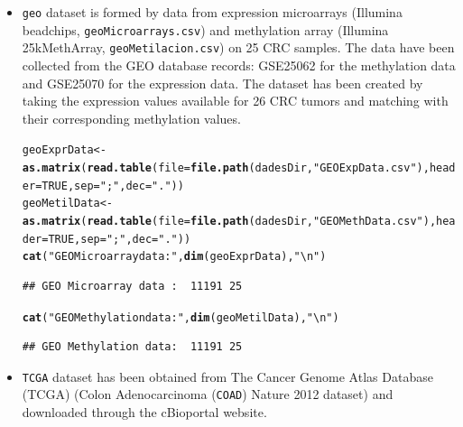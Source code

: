 \documentclass[a4paper,10pt]{article}\usepackage[]{graphicx}\usepackage[]{color}
\makeatletter
\newcommand{\hlnum}[1]{\textcolor[rgb]{0.686,0.059,0.569}{#1}}%
\newcommand{\hlstr}[1]{\textcolor[rgb]{0.192,0.494,0.8}{#1}}%
\newcommand{\hlstd}[1]{\textcolor[rgb]{0.345,0.345,0.345}{#1}}%
\newcommand{\hlkwb}[1]{\textcolor[rgb]{0.69,0.353,0.396}{#1}}%
\newcommand{\hlkwc}[1]{\textcolor[rgb]{0.333,0.667,0.333}{#1}}%
\newcommand{\hlkwd}[1]{\textcolor[rgb]{0.737,0.353,0.396}{\textbf{#1}}}%
\newenvironment{kframe}{%
 \def\at@end@of@kframe{}%
 \ifinner\ifhmode%
  \def\at@end@of@kframe{\end{minipage}}%
  \begin{minipage}{\columnwidth}%
 \fi\fi%
 \def\FrameCommand##1{\hskip\@totalleftmargin \hskip-\fboxsep
 \colorbox{shadecolor}{##1}\hskip-\fboxsep
     \hskip-\linewidth \hskip-\@totalleftmargin \hskip\columnwidth}%
 \MakeFramed {\advance\hsize-\width
   \@totalleftmargin\z@ \linewidth\hsize
   \@setminipage}}%
 {\par\unskip\endMakeFramed%
 \at@end@of@kframe}
\newenvironment{knitrout}{}{} %
\makeatother
\begin{document}
\begin{itemize}
\item \texttt{geo} dataset is formed by data from expression microarrays (Illumina beadchips, \texttt{geoMicroarrays.csv}) and methylation array (Illumina 25kMethArray, \texttt{geoMetilacion.csv}) on 25 CRC samples. The data have been collected from the GEO database records: GSE25062 for the methylation data and GSE25070 for the expression data. The dataset has been created by taking the expression values available for 26 CRC tumors and matching with their corresponding methylation values.

\begin{knitrout}
\color{fgcolor}\begin{kframe}
\begin{alltt}
\hlstd{geoExprData} \hlkwb{<-}  \hlkwd{as.matrix}\hlstd{(}\hlkwd{read.table}\hlstd{(}\hlkwc{file}\hlstd{=}\hlkwd{file.path}\hlstd{(dadesDir,}\hlstr{"GEOExpData.csv"}\hlstd{),} \hlkwc{header}\hlstd{=}\hlnum{TRUE}\hlstd{,} \hlkwc{sep}\hlstd{=}\hlstr{";"}\hlstd{,} \hlkwc{dec}\hlstd{=}\hlstr{"."}\hlstd{))}
\hlstd{geoMetilData} \hlkwb{<-}  \hlkwd{as.matrix}\hlstd{(}\hlkwd{read.table}\hlstd{(}\hlkwc{file}\hlstd{=}\hlkwd{file.path}\hlstd{(dadesDir,}\hlstr{"GEOMethData.csv"}\hlstd{),} \hlkwc{header}\hlstd{=}\hlnum{TRUE}\hlstd{,} \hlkwc{sep}\hlstd{=}\hlstr{";"}\hlstd{,} \hlkwc{dec}\hlstd{=}\hlstr{"."}\hlstd{))}
\hlkwd{cat}\hlstd{(}\hlstr{"GEO Microarray data : "}\hlstd{,} \hlkwd{dim}\hlstd{(geoExprData),} \hlstr{"\textbackslash{}n"}\hlstd{)}
\end{alltt}
\begin{verbatim}
## GEO Microarray data :  11191 25
\end{verbatim}
\begin{alltt}
\hlkwd{cat}\hlstd{(}\hlstr{"GEO Methylation data: "}\hlstd{,} \hlkwd{dim}\hlstd{(geoMetilData),} \hlstr{"\textbackslash{}n"}\hlstd{)}
\end{alltt}
\begin{verbatim}
## GEO Methylation data:  11191 25
\end{verbatim}
\end{kframe}
\end{knitrout}

\item \texttt{TCGA} dataset has been obtained from The Cancer Genome Atlas Database (TCGA) (Colon Adenocarcinoma (\texttt{COAD}) Nature 2012 dataset) and downloaded through the cBioportal website.


\end{itemize}
\end{document}
